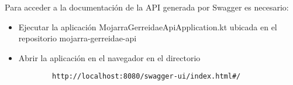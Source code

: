 Para acceder a la documentación de la API generada por Swagger es necesario: 

\begin{itemize}
    \item Ejecutar la aplicación MojarraGerreidaeApiApplication.kt ubicada en el repositorio mojarra-gerreidae-api
    \item Abrir la aplicación en el navegador en el directorio
    \begin{verbatim}
        http://localhost:8080/swagger-ui/index.html#/
    \end{verbatim}
    
\end{itemize}